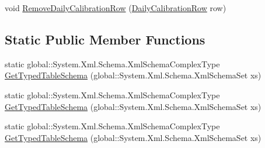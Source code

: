 \begin{DoxyCompactItemize}
\item 
void \hyperlink{class_env_int_1_1_win32_1_1_field_tech_1_1_manager_1_1_data_sets_1_1_guide_ware_mobile_data_set_5b380d875f3f569d74f6183f0c2ee8d7_a74c82b018660dfd8dadd40030c667b17}{Remove\+Daily\+Calibration\+Row} (\hyperlink{class_env_int_1_1_win32_1_1_field_tech_1_1_manager_1_1_data_sets_1_1_guide_ware_mobile_data_set_1_1_daily_calibration_row}{Daily\+Calibration\+Row} row)
\end{DoxyCompactItemize}
\subsection*{Static Public Member Functions}
\begin{DoxyCompactItemize}
\item 
static global\+::\+System.\+Xml.\+Schema.\+Xml\+Schema\+Complex\+Type \hyperlink{class_env_int_1_1_win32_1_1_field_tech_1_1_manager_1_1_data_sets_1_1_guide_ware_mobile_data_set_5b380d875f3f569d74f6183f0c2ee8d7_a07b2d649a91cf16732e48e2bccc556f4}{Get\+Typed\+Table\+Schema} (global\+::\+System.\+Xml.\+Schema.\+Xml\+Schema\+Set xs)
\item 
static global\+::\+System.\+Xml.\+Schema.\+Xml\+Schema\+Complex\+Type \hyperlink{class_env_int_1_1_win32_1_1_field_tech_1_1_manager_1_1_data_sets_1_1_guide_ware_mobile_data_set_5b380d875f3f569d74f6183f0c2ee8d7_a07b2d649a91cf16732e48e2bccc556f4}{Get\+Typed\+Table\+Schema} (global\+::\+System.\+Xml.\+Schema.\+Xml\+Schema\+Set xs)
\item 
static global\+::\+System.\+Xml.\+Schema.\+Xml\+Schema\+Complex\+Type \hyperlink{class_env_int_1_1_win32_1_1_field_tech_1_1_manager_1_1_data_sets_1_1_guide_ware_mobile_data_set_5b380d875f3f569d74f6183f0c2ee8d7_a07b2d649a91cf16732e48e2bccc556f4}{Get\+Typed\+Table\+Schema} (global\+::\+System.\+Xml.\+Schema.\+Xml\+Schema\+Set xs)
\end{DoxyCompactItemize}
